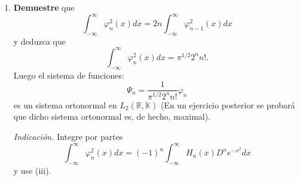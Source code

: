 \documentclass[12pt]{report}
\theoremstyle{largebreak}
\begin{document}
\begin{excer}
\begin{enumerate}
            \item \textbf{Demuestre} que
            \begin{equation*}
                \int_{-\infty}^\infty\varphi_n^2(x)dx=2n\int_{-\infty}^\infty\varphi_{n-1}^2(x)dx
            \end{equation*}
            y deduzca que
            \begin{equation*}
                \int_{-\infty}^\infty\varphi_n^2(x)dx=\pi^{1/2}2^nn!.
            \end{equation*}
            Luego el sistema de funciones:
            \begin{equation*}
                \Psi_n=\frac{1}{\pi^{1/2}2^nn!}\varphi_n
            \end{equation*}
            es un sistema ortonormal en $L_2(\mathbb{R},\mathbb{K})$ (En un ejercicio posterior se probará que dicho sistema ortonormal es, de hecho, maximal).

            \textit{Indicación.} Integre por partes
            \begin{equation*}
                \int_{-\infty}^\infty\varphi_n^2(x)dx=(-1)^n\int_{-\infty}^\infty H_n(x)D^ne^{-x^2}dx
            \end{equation*}
            y use (iii).
        \end{enumerate}
    \end{excer}
\end{document}
